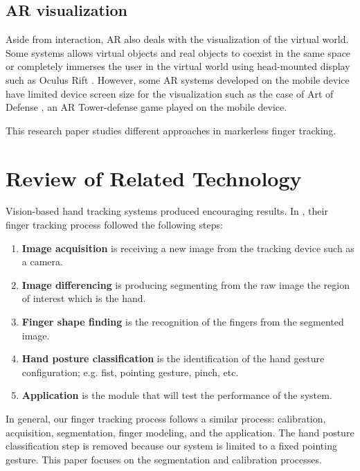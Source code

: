 \documentclass{acm_proc_article-sp}
\begin{document}
\subsection{AR visualization}

Aside from interaction, AR also deals with the visualization of the virtual world. Some systems allows virtual objects and real objects to coexist in the same space or completely immerses the user in the virtual world using head-mounted display such as Oculus Rift \cite{Oculus}. However, some AR systems developed on the mobile device have limited device screen size for the visualization such as the case of Art of Defense \cite{Huynh:2009}, an AR Tower-defense game played on the mobile device. 

This research paper studies different approaches in markerless finger tracking.


\section{Review of Related Technology}
Vision-based hand tracking systems \cite{HurstWolfgangVanWezel:2013, HurstWolfgangVriens:2013} produced encouraging results. In \cite{Hardenberg:2001}, their finger tracking process followed the following steps:

\begin{enumerate}
	\item \textbf{Image acquisition} is receiving a new image from the tracking device such as a camera.
	\item \textbf{Image differencing} is producing segmenting from the raw image the region of interest which is the hand.
	\item \textbf{Finger shape finding} is the recognition of the fingers from the segmented image. 
	\item \textbf{Hand posture classification} is the identification of the hand gesture configuration; e.g. fist, pointing gesture, pinch, etc.
	\item \textbf{Application} is the module that will test the performance of the system.
\end{enumerate}

In general, our finger tracking process follows a similar process: calibration, acquisition, segmentation, finger modeling, and the application. The hand posture classification step is removed because our system is limited to a fixed pointing gesture. This paper focuses on the segmentation and calibration processes.
\end{document}
